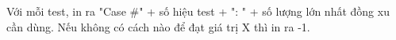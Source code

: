 Với mỗi test, in ra "Case \#" + số hiệu test + ": " + số lượng lớn nhất đồng xu cần dùng. Nếu không có cách nào để đạt giá trị X thì in ra -1.  

\